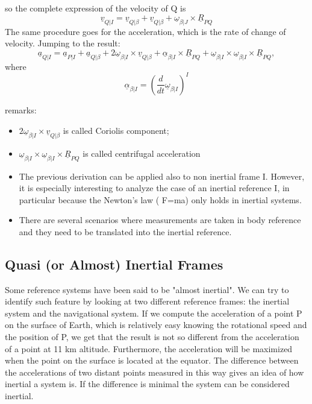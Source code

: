so the complete expression of the velocity of Q is
\begin{equation}    
    \underline{v}_{Q|I} = \underline{v}_{Q|\beta} + \underline{v}_{Q|\beta} + \underline{\omega}_{\beta|J}\times \underline{R}_{PQ}
\end{equation}
The same procedure goes for the acceleration, which is the rate of change of velocity. Jumping to the result:
\begin{equation}
    \underline{a}_{Q|I} = \underline{a}_{P|I} + \underline{a}_{Q|\beta} + 2\underline{\omega}_{\beta|I} \times \underline{v}_{Q|\beta} + \underline{\alpha}_{\beta|I} \times \underline{R}_{PQ} + \underline{\omega}_{\beta|I}\times \underline{\omega}_{\beta|I}\times \underline{R}_{PQ},
\end{equation}
where 
\begin{equation}
    \underline{\alpha}_{\beta|I} = \left(\frac{d}{dt}\underline{\omega}_{\beta|I}\right)^I
\end{equation}

remarks:
\begin{itemize}
    \item $2\underline{\omega}_{\beta|I} \times \underline{v}_{Q|\beta}$ is called Coriolis component;
    \item $\underline{\omega}_{\beta|I}\times \underline{\omega}_{\beta|I}\times \underline{R}_{PQ}$ is called centrifugal acceleration
    \item The previous derivation can be applied also to non inertial frame I. However, it is especially interesting to analyze the case of an inertial reference I, in particular because the Newton's law ( F=ma) only holds in inertial systems.
    \item There are several scenarios where measurements are taken in body reference and they need to be translated into the inertial reference. 
\end{itemize}

\subsection{Quasi (or Almost) Inertial Frames}
Some reference systems have been said to be "almost inertial". We can try to identify such feature by looking at two different reference frames: the inertial system and the navigational system. If we compute the acceleration of a point P on the surface of Earth, which is relatively easy knowing the rotational speed and the position of P, we get that the result is not so different from the acceleration of a point at 11 km altitude. Furthermore, the acceleration will be maximized when the point on the surface is located at the equator. The difference between the accelerations of two distant points measured in this way gives an idea of how inertial a system is. If the difference is minimal the system can be considered inertial.

